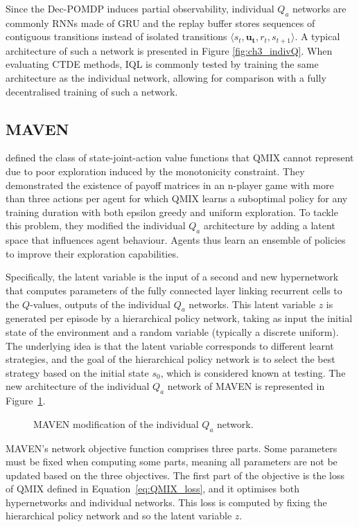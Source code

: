 Since the Dec-POMDP induces partial observability, individual $Q_a$ networks are commonly RNNs made of GRU \citep{Chung2014EmpiricalModeling} and the replay buffer stores sequences of contiguous transitions instead of isolated transitions $\langle s_{t},\mathbf{u_{t}},r_{t},s_{t+1}\rangle$.
A typical architecture of such a network is presented in Figure \ref{fig:ch3_indivQ}.
When evaluating CTDE methods, IQL is commonly tested by training the same architecture as the individual network, allowing for comparison with a fully decentralised training of such a network.

\subsection{MAVEN}
\citet{Mahajan2019MAVEN:Exploration} defined the class of state-joint-action value functions that QMIX cannot represent due to poor exploration induced by the monotonicity constraint.
They demonstrated the existence of payoff matrices in an n-player game with more than three actions per agent for which QMIX learns a suboptimal policy for any training duration with both epsilon greedy and uniform exploration.
To tackle this problem, they modified the individual $Q_a$ architecture by adding a latent space that influences agent behaviour.
Agents thus learn an ensemble of policies to improve their exploration capabilities.

Specifically, the latent variable is the input of a second and new hypernetwork that computes parameters of the fully connected layer linking recurrent cells to the $Q$-values, outputs of the individual $Q_a$ networks.
This latent variable $z$ is generated per episode by a hierarchical policy network, taking as input the initial state of the environment and a random variable (typically a discrete uniform).
The underlying idea is that the latent variable corresponds to different learnt strategies, and the goal of the hierarchical policy network is to select the best strategy based on the initial state $s_0$, which is considered known at testing.
The new architecture of the individual $Q_a$ network of MAVEN is represented in Figure~\ref{fig:maven}.

\begin{figure}
\centering

\caption{MAVEN modification of the individual $Q_a$ network.}
\label{fig:maven}
\end{figure}

MAVEN's network objective function comprises three parts.
Some parameters must be fixed when computing some parts, meaning all parameters are not be updated based on the three objectives.
The first part of the objective is the loss of QMIX defined in Equation~\ref{eq:QMIX_loss}, and it optimises both hypernetworks and individual networks.
This loss is computed by fixing the hierarchical policy network and so the latent variable $z$.

